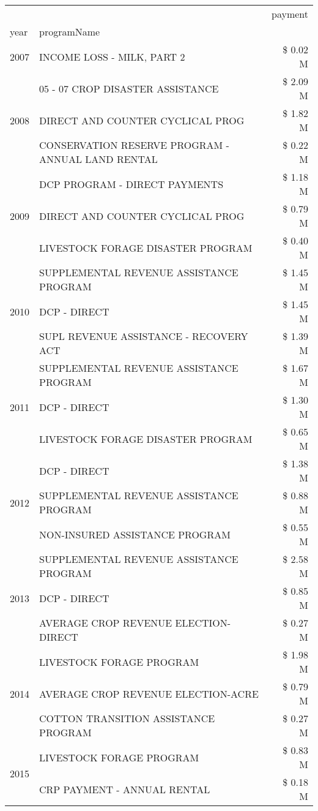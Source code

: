 \begin{tabular}{llr}
\toprule
 &  & payment \\
year & programName &  \\
\midrule
2007 & INCOME LOSS - MILK, PART 2 & \$ 0.02 M \\
\cline{1-3}
\multirow[t]{3}{*}{2008} & 05 - 07 CROP DISASTER ASSISTANCE & \$ 2.09 M \\
 & DIRECT AND COUNTER CYCLICAL PROG & \$ 1.82 M \\
 & CONSERVATION RESERVE PROGRAM - ANNUAL LAND RENTAL & \$ 0.22 M \\
\cline{1-3}
\multirow[t]{3}{*}{2009} & DCP PROGRAM - DIRECT PAYMENTS & \$ 1.18 M \\
 & DIRECT AND COUNTER CYCLICAL PROG & \$ 0.79 M \\
 & LIVESTOCK FORAGE DISASTER  PROGRAM & \$ 0.40 M \\
\cline{1-3}
\multirow[t]{3}{*}{2010} & SUPPLEMENTAL REVENUE ASSISTANCE PROGRAM & \$ 1.45 M \\
 & DCP - DIRECT & \$ 1.45 M \\
 & SUPL REVENUE ASSISTANCE - RECOVERY ACT & \$ 1.39 M \\
\cline{1-3}
\multirow[t]{3}{*}{2011} & SUPPLEMENTAL REVENUE ASSISTANCE PROGRAM & \$ 1.67 M \\
 & DCP - DIRECT & \$ 1.30 M \\
 & LIVESTOCK FORAGE DISASTER PROGRAM & \$ 0.65 M \\
\cline{1-3}
\multirow[t]{3}{*}{2012} & DCP - DIRECT & \$ 1.38 M \\
 & SUPPLEMENTAL REVENUE ASSISTANCE PROGRAM & \$ 0.88 M \\
 & NON-INSURED ASSISTANCE PROGRAM & \$ 0.55 M \\
\cline{1-3}
\multirow[t]{3}{*}{2013} & SUPPLEMENTAL REVENUE ASSISTANCE PROGRAM & \$ 2.58 M \\
 & DCP - DIRECT & \$ 0.85 M \\
 & AVERAGE CROP REVENUE ELECTION-DIRECT & \$ 0.27 M \\
\cline{1-3}
\multirow[t]{3}{*}{2014} & LIVESTOCK FORAGE PROGRAM & \$ 1.98 M \\
 & AVERAGE CROP REVENUE ELECTION-ACRE & \$ 0.79 M \\
 & COTTON TRANSITION ASSISTANCE PROGRAM & \$ 0.27 M \\
\cline{1-3}
\multirow[t]{3}{*}{2015} & LIVESTOCK FORAGE PROGRAM & \$ 0.83 M \\
 & CRP PAYMENT - ANNUAL RENTAL & \$ 0.18 M \\

\end{tabular}
